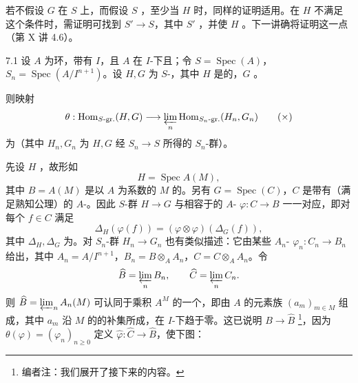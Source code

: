 若不假设 $G$ 在 $S$ 上，而假设 $S$ ，至少当 $H$ 时，同样的证明适用。在 $H$ 不满足这个条件时，需证明可找到 $S'\to S$，其中 $S'$ ，并使 $H$ 。下一讲确将证明这一点（第 X 讲 4.6）。
\begin{SGAresult}{}{7.1}
设 $A$ 为环，带有 $I$，且 $A$ 在 $I$-下且；令 $S=\operatorname{Spec}(A)$，$S_n=\operatorname{Spec}(A/I^{n+1})$。设 $H,G$ 为 $S$-，其中 $H$ 是的，$G$ 。

则映射
\[\theta:\operatorname{Hom}_{S\text{-gr.}}(H,G)\longrightarrow\varprojlim_n\operatorname{Hom}_{S_n\text{-gr.}}(H_n,G_n)\tag{$\times$}\]
为（其中 $H_n,G_n$ 为 $H,G$ 经 $S_n\to S$ 所得的 $S_n$-群）。
\end{SGAresult}
先设 $H$ ，故形如
\[H=\operatorname{Spec}A(M),\]
其中 $B=A(M)$ 是以 $A$ 为系数的 $M$ 的。另有 $G=\operatorname{Spec}(C)$，$C$ 是带有（满足熟知公理）的 $A$-。因此 $S$-群 $H\to G$ 与相容于的 $A$- $\varphi:C\to B$ 一一对应，即对每个 $f\in C$ 满足
\[\Delta_H(\varphi(f))=(\varphi\otimes\varphi)(\Delta_G(f)),\]
其中 $\Delta_H,\Delta_G$ 为。对 $S_n$-群 $H_n\to G_n$ 也有类似描述：它由某些 $A_n$- $\varphi_n:C_n\to B_n$ 给出，其中 $A_n=A/I^{n+1}$，$B_n=B\otimes_A A_n$，$C=C\otimes_A A_n$。令
\[\widehat B=\varprojlim_nB_n,\qquad\widehat C=\varprojlim_nC_n.\]
则 $\widehat B=\varprojlim_n A_n(M)$ 可认同于乘积 $A^M$ 的一个，即由 $A$ 的元素族 $(a_m)_{m\in M}$ 组成，其中 $a_m$ 沿 $M$ 的的补集所成，在 $I$-下趋于零。这已说明 $B\to\widehat B$ \footnote{编者注：我们展开了接下来的内容。}，因为 $\theta(\varphi)=(\varphi_n)_{n\geq0}$ 定义 $\widehat\varphi:\widehat C\to\widehat B$，使下图：

